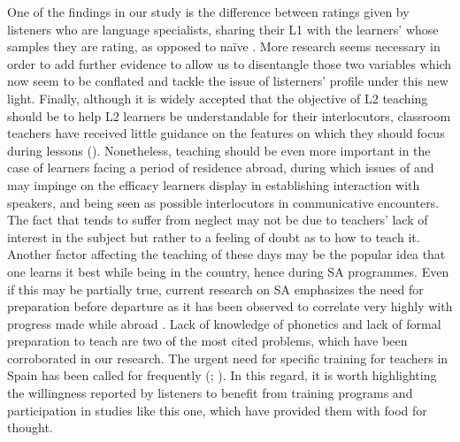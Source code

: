 \documentclass[output=paper]{langsci/langscibook}
\begin{document}
One of the findings in our study is the difference between ratings given by listeners who are language specialists, sharing their {L1} with the learners’ whose samples they are rating, as opposed to naïve . More research seems necessary in order to add further evidence to allow us to disentangle those two variables which now seem to be conflated and tackle the issue of listerners’ profile under this new light. Finally, although it is widely accepted that the objective of {L2}  teaching should be to help {L2} learners be understandable for their interlocutors, classroom teachers have received little guidance on the  features on which they should focus during lessons (\citealt{DerwingMunro2009}). Nonetheless, teaching  should be even more important in the case of  learners facing a period of residence abroad, during which issues of  and  may impinge on the efficacy learners display in establishing interaction with  speakers, and being seen as possible interlocutors in communicative encounters. The fact that  tends to suffer from neglect may not be due to teachers’ lack of interest in the subject but rather to a feeling of doubt as to how to teach it. Another factor affecting the teaching of  these days may be the popular idea that one learns it best while being in the  country, hence during SA programmes. Even if this may be partially true, current research on SA emphasizes the need for preparation before departure as it has been observed to correlate very highly with progress made while abroad \citep{PaigeEtAl2002}. Lack of knowledge of phonetics and lack of formal preparation to teach  are two of the most cited problems, which have been corroborated in our research. The urgent need for specific  training for teachers in Spain has been called for frequently (\citealt{Levey1999}; \cite{Levey2001}\citealt{Donovan2001,Pavón2001,PavónRosado2003}). In this regard, it is worth highlighting the willingness reported by listeners to benefit from  training programs and participation in studies like this one, which have provided them with food for thought. 
\end{document}
